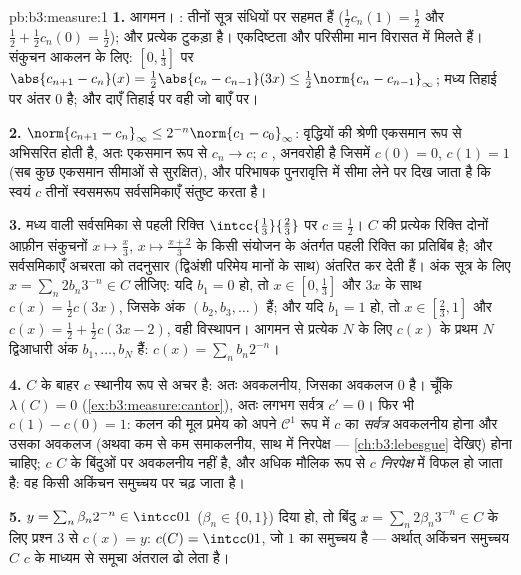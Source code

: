 \begin{solution}{pb:b3:measure:1}
\textbf{1.} आगमन। : तीनों सूत्र संधियों पर सहमत हैं ($\frac12c_n(1) = \frac12$
और $\frac12 +
\frac12c_n(0) = \frac12$); और प्रत्येक टुकड़ा  है। एकदिष्टता और परिसीमा मान
विरासत में मिलते हैं। संकुचन आकलन के लिए: $[0,\frac13]$ पर $\abs{c_{n+1} - c_n}(x)
= \frac12\abs{c_n - c_{n-1}}(3x) \leq \frac12\norm{c_n -
c_{n-1}}_\infty$; मध्य तिहाई
पर अंतर $0$ है; और दाएँ तिहाई पर वही जो बाएँ पर।

\textbf{2.} $\norm{c_{n+1} - c_n}_\infty \leq
2^{-n}\norm{c_1 - c_0}_\infty$: वृद्धियों की श्रेणी एकसमान रूप से अभिसरित होती
है, अतः एकसमान रूप से $c_n \to c$; $c$ , अनवरोही है जिसमें $c(0) = 0$,
$c(1) = 1$ (सब कुछ एकसमान सीमाओं से सुरक्षित), और परिभाषक पुनरावृत्ति
में सीमा लेने पर दिख जाता है कि स्वयं $c$ तीनों स्वसमरूप सर्वसमिकाएँ
संतुष्ट करता है।

\textbf{3.} मध्य वाली सर्वसमिका से पहली रिक्ति $\intcc{\frac13}{\frac23}$ पर $c \equiv \frac12$।
$C$ की प्रत्येक रिक्ति दोनों आफ़ीन संकुचनों $x \mapsto \frac x3$, $x\mapsto\frac{x +
2}3$ के किसी
संयोजन के अंतर्गत पहली रिक्ति का प्रतिबिंब है; और सर्वसमिकाएँ अचरता
को तदनुसार (द्विअंशी परिमेय मानों के साथ) अंतरित कर देती हैं। अंक
सूत्र के लिए $x =
\sum_n 2b_n3^{-n} \in C$ लीजिए: यदि $b_1 = 0$ हो, तो $x \in
[0,\frac13]$ और $3x$ के साथ
$c(x) = \frac12c(3x)$, जिसके अंक $(b_2, b_3, \dots)$ हैं; और यदि $b_1 = 1$ हो, तो $x \in [\frac23, 1]$ और $c(x) = \frac12 + \frac12c(3x - 2)$, वही
विस्थापन। आगमन से प्रत्येक $N$ के लिए $c(x)$ के प्रथम $N$ द्विआधारी
अंक $b_1,
\dots, b_N$ हैं: $c(x) = \sum_nb_n2^{-n}$।

\textbf{4.} $C$ के बाहर $c$ स्थानीय रूप से अचर है: अतः अवकलनीय,
जिसका अवकलज $0$ है। चूँकि $\lambda(C) = 0$ (\cref{ex:b3:measure:cantor}), अतः लगभग सर्वत्र $c' = 0$।
फिर भी $c(1) - c(0) = 1$: कलन की मूल प्रमेय को अपने $\mathcal
C^1$ रूप में $c$ का
\emph{सर्वत्र} अवकलनीय होना और उसका अवकलज  (अथवा कम से कम
समाकलनीय, साथ में निरपेक्ष  --- \cref{ch:b3:lebesgue} देखिए) होना चाहिए;
$c$ $C$ के बिंदुओं पर अवकलनीय नहीं है, और अधिक मौलिक रूप से
$c$ \emph{निरपेक्ष } में विफल हो जाता है: वह किसी अकिंचन
समुच्चय पर चढ़ जाता है।

\textbf{5.} $y = \sum_n\beta_n2^{-n} \in \intcc01$ ($\beta_n \in \{0,1\}$) दिया हो, तो बिंदु $x = \sum_n2\beta_n3^{-n}
\in C$ के लिए प्रश्न 3
से $c(x) = y$: $c(C) = \intcc01$, जो  $1$ का समुच्चय है --- अर्थात् अकिंचन
समुच्चय $C$ $c$ के माध्यम से समूचा अंतराल ढो लेता है।


\end{solution}
